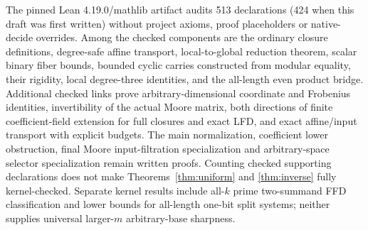 \documentclass[11pt]{article}
\theoremstyle{remark}\newtheorem{remark}[theorem]{Remark}
\begin{document}
The pinned Lean 4.19.0/mathlib artifact audits 513 declarations (424 when this draft was first written) without
project axioms, proof placeholders or native-decide overrides. Among the
checked components are the ordinary closure definitions, degree-safe affine
transport, local-to-global reduction theorem, scalar binary fiber bounds,
bounded cyclic carries constructed from modular equality, their rigidity,
local degree-three identities, and the all-length even product bridge.
Additional checked links prove arbitrary-dimensional coordinate and Frobenius
identities, invertibility of the actual Moore matrix, both directions of
finite coefficient-field extension for full closures and exact LFD, and
exact affine/input transport with explicit budgets. The main normalization,
coefficient lower obstruction, final Moore input-filtration specialization
and arbitrary-space selector specialization remain written proofs.
Counting checked supporting declarations does not make
Theorems~\ref{thm:uniform} and \ref{thm:inverse} fully kernel-checked.
Separate kernel results include all-$k$ prime two-summand FFD classification
and lower bounds for all-length one-bit split systems; neither supplies
universal larger-$m$ arbitrary-base sharpness.
\end{document}
